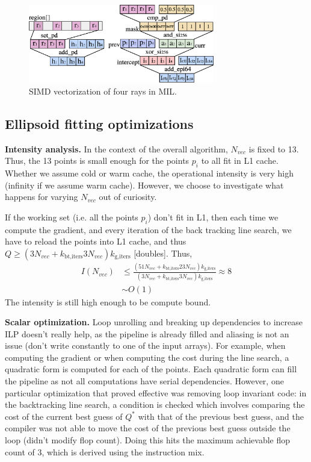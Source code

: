 \documentclass[letterpaper]{article}
\newcommand{\mypar}[1]{{\bf #1.}}
\begin{document}
\begin{figure}[h]
    \centering
    \includegraphics[width=3.2in]{figs/simd_mil2.eps}
    \caption{SIMD vectorization of four rays in MIL.}
    \label{fig:simd_mil}
\end{figure}


\subsection{Ellipsoid fitting optimizations} 
\mypar{Intensity analysis}  In the context of the overall algorithm, $N_{vec}$ is fixed to 13. Thus, the 13 points is small enough for the points $p_i$ to all fit in L1 cache. Whether we assume cold or warm cache, the operational intensity is very high (infinity if we assume warm cache). However, we choose to investigate what happens for varying $N_{vec}$ out of curiosity.

If the working set (i.e. all the points $p_i$) don't fit in L1, then each time we compute the gradient, and every iteration of the back tracking line search, we have to reload the points into L1 cache, and thus $Q\geq (3N_{vec} + k_\text{bt,iters}3N_{vec})k_\text{g,iters}$ [doubles]. Thus,
\begin{align*}
  I(N_{vec}) &\leq \frac{(51N_{vec} + k_\text{bt,iters}23N_{vec})k_\text{g,iters}}{(3N_{vec} + k_\text{bt,iters}3N_{vec})k_\text{g,iters}} \approx 8 \\
  &\sim O(1)
\end{align*}
The intensity is still high enough to be compute bound. 

\mypar{Scalar optimization}
Loop unrolling and breaking up dependencies to increase ILP doesn't really help, as the pipeline is already filled and aliasing is not an issue (don't write constantly to one of the input arrays). For example, when computing the gradient or when computing the cost during the line search, a quadratic form is computed for each of the points. Each quadratic form can fill the pipeline as not all computations have serial dependencies. However, one particular optimization that proved effective was removing loop invariant code: in the backtracking line search, a condition is checked which involves comparing the cost of the current best guess of $Q^*$ with that of the previous best guess, and the compiler was not able to move the cost of the previous best guess outside the loop (didn't modify flop count). Doing this hits the maximum achievable flop count of 3, which is derived using the instruction mix.
\end{document}
